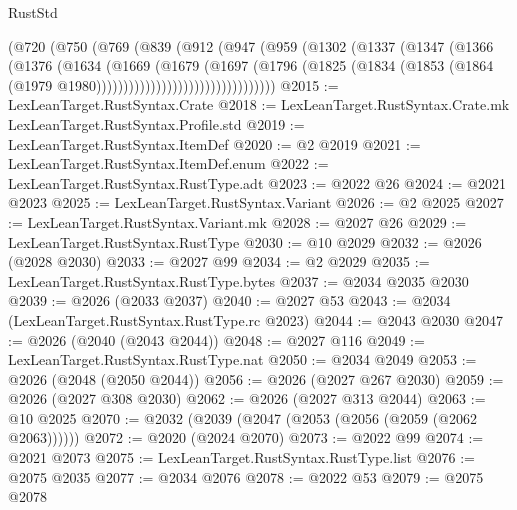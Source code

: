 \begin{lexlean}{RustStd}
\begin{coremodule}
                          (@720
                            (@750
                              (@769
                                (@839
                                  (@912
                                    (@947
                                      (@959
                                        (@1302
                                          (@1337
                                            (@1347
                                              (@1366
                                                (@1376
                                                  (@1634
                                                    (@1669
                                                      (@1679
                                                        (@1697
                                                          (@1796
                                                            (@1825
                                                              (@1834
                                                                (@1853
                                                                  (@1864
                                                                    (@1979
                                                                      @1980)))))))))))))))))))))))))))))))))
@2015 := LexLeanTarget.RustSyntax.Crate
@2018 := LexLeanTarget.RustSyntax.Crate.mk LexLeanTarget.RustSyntax.Profile.std
@2019 := LexLeanTarget.RustSyntax.ItemDef
@2020 := @2 @2019
@2021 := LexLeanTarget.RustSyntax.ItemDef.enum
@2022 := LexLeanTarget.RustSyntax.RustType.adt
@2023 := @2022 @26
@2024 := @2021 @2023
@2025 := LexLeanTarget.RustSyntax.Variant
@2026 := @2 @2025
@2027 := LexLeanTarget.RustSyntax.Variant.mk
@2028 := @2027 @26
@2029 := LexLeanTarget.RustSyntax.RustType
@2030 := @10 @2029
@2032 := @2026 (@2028 @2030)
@2033 := @2027 @99
@2034 := @2 @2029
@2035 := LexLeanTarget.RustSyntax.RustType.bytes
@2037 := @2034 @2035 @2030
@2039 := @2026 (@2033 @2037)
@2040 := @2027 @53
@2043 := @2034 (LexLeanTarget.RustSyntax.RustType.rc @2023)
@2044 := @2043 @2030
@2047 := @2026 (@2040 (@2043 @2044))
@2048 := @2027 @116
@2049 := LexLeanTarget.RustSyntax.RustType.nat
@2050 := @2034 @2049
@2053 := @2026 (@2048 (@2050 @2044))
@2056 := @2026 (@2027 @267 @2030)
@2059 := @2026 (@2027 @308 @2030)
@2062 := @2026 (@2027 @313 @2044)
@2063 := @10 @2025
@2070 := @2032 (@2039 (@2047 (@2053 (@2056 (@2059 (@2062 @2063))))))
@2072 := @2020 (@2024 @2070)
@2073 := @2022 @99
@2074 := @2021 @2073
@2075 := LexLeanTarget.RustSyntax.RustType.list
@2076 := @2075 @2035
@2077 := @2034 @2076
@2078 := @2022 @53
@2079 := @2075 @2078

\end{coremodule}
\end{lexlean}
